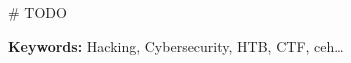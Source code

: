 \# TODO

\textbf{Keywords:} Hacking, Cybersecurity, \acrlong{HTB}, \acrshort{CTF}, \acrlong{ceh}\ldots

